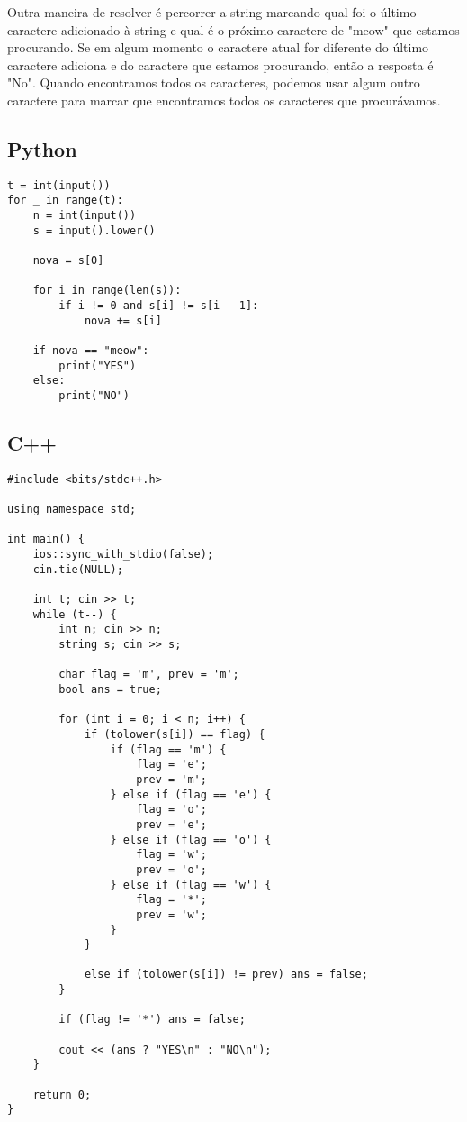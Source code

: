 \documentclass[11pt,fancychapters]{article}
\begin{document}
Outra maneira de resolver é percorrer a string marcando qual foi o último caractere adicionado à string e qual é o próximo caractere de "meow" que estamos procurando. Se em algum momento o caractere atual for diferente do último caractere adiciona e do caractere que estamos procurando, então a resposta é "No". Quando encontramos todos os caracteres, podemos usar algum outro caractere para marcar que encontramos todos os caracteres que procurávamos.\\
\subsection{Python}
\begin{lstlisting}[style=python]
t = int(input())
for _ in range(t):
    n = int(input())
    s = input().lower()
    
    nova = s[0]
    
    for i in range(len(s)):
        if i != 0 and s[i] != s[i - 1]:
            nova += s[i]
    
    if nova == "meow":
        print("YES")
    else:
        print("NO")
\end{lstlisting}
\newpage
\subsection{C++}
\begin{lstlisting}[style=c++]
#include <bits/stdc++.h>

using namespace std;

int main() {
    ios::sync_with_stdio(false);
    cin.tie(NULL);
    
    int t; cin >> t;
    while (t--) {
        int n; cin >> n;
        string s; cin >> s;

        char flag = 'm', prev = 'm';
        bool ans = true;

        for (int i = 0; i < n; i++) {
            if (tolower(s[i]) == flag) {
                if (flag == 'm') {
                    flag = 'e';
                    prev = 'm';
                } else if (flag == 'e') {
                    flag = 'o';
                    prev = 'e';
                } else if (flag == 'o') {
                    flag = 'w';
                    prev = 'o';
                } else if (flag == 'w') {
                    flag = '*';
                    prev = 'w';
                }
            }

            else if (tolower(s[i]) != prev) ans = false;
        }
        
        if (flag != '*') ans = false;

        cout << (ans ? "YES\n" : "NO\n");
    }

    return 0;
}
\end{lstlisting}
\newpage
\end{document}
